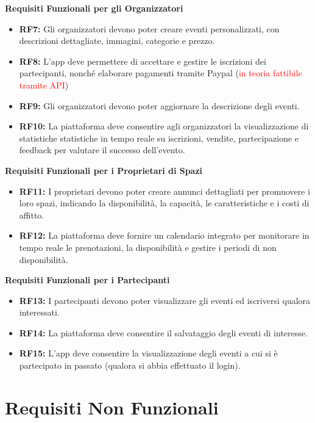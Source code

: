 \documentclass[9pt]{extarticle}
\begin{document}
\textbf{Requisiti Funzionali per gli Organizzatori}
\begin{itemize}
	\item \textbf{RF7:} Gli organizzatori devono poter creare eventi personalizzati, con descrizioni dettagliate, immagini, categorie e prezzo.
	\item \textbf{RF8:} L’app deve permettere di accettare e gestire le iscrizioni dei partecipanti, nonché elaborare pagamenti tramite Paypal (\textcolor{red}{in teoria fattibile tramite API})
	\item \textbf{RF9:} Gli organizzatori devono poter aggiornare la descrizione degli eventi.
	\item \textbf{RF10:} La piattaforma deve consentire agli organizzatori la visualizzazione di statistiche statistiche in tempo reale su iscrizioni, vendite, partecipazione e feedback per valutare il successo dell’evento.
\end{itemize}

\textbf{Requisiti Funzionali per i Proprietari di Spazi}
\begin{itemize}
	\item \textbf{RF11:} I proprietari devono poter creare annunci dettagliati per promuovere i loro spazi, indicando la disponibilità, la capacità, le caratteristiche e i costi di affitto.
	\item \textbf{RF12:} La piattaforma deve fornire un calendario integrato per monitorare in tempo reale le prenotazioni, la disponibilità e gestire i periodi di non disponibilità.
\end{itemize}


\textbf{Requisiti Funzionali per i Partecipanti}
\begin{itemize}
	\item \textbf{RF13:} I partecipanti devono poter visualizzare gli eventi ed iscriversi qualora interessati.
	\item \textbf{RF14:} La piattaforma deve consentire il salvataggio degli eventi di interesse.
	\item \textbf{RF15:} L'app deve consentire la visualizzazione degli eventi a cui si è partecipato in passato (qualora si abbia effettuato il login).
\end{itemize}

\section{Requisiti Non Funzionali}
\end{document}
